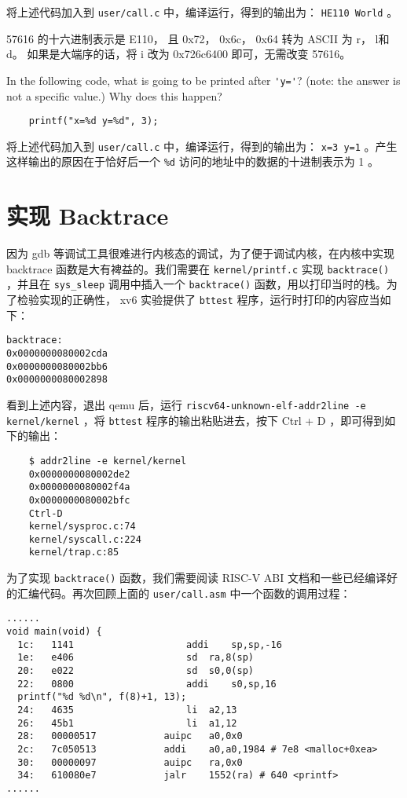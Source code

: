 \begin{solution}
将上述代码加入到 \lstinline{user/call.c} 中，编译运行，得到的输出为： \lstinline{HE110 World} 。

57616 的十六进制表示是 E110， 且 0x72， 0x6c， 0x64 转为 ASCII 为 r， l和 d。 如果是大端序的话，将 i 改为 0x726c6400 即可，无需改变 57616。
\end{solution}

\begin{exercise}
    In the following code, what is going to be printed after \lstinline{'y='}? (note: the answer is not a specific value.) Why does this happen?
\begin{lstlisting}
    printf("x=%d y=%d", 3);
\end{lstlisting}
\end{exercise}

\begin{solution}
将上述代码加入到 \lstinline{user/call.c} 中，编译运行，得到的输出为： \lstinline{x=3 y=1} 。产生这样输出的原因在于恰好后一个 \lstinline{%d} 访问的地址中的数据的十进制表示为 1 。
\end{solution}

\section{实现 Backtrace }

因为 gdb 等调试工具很难进行内核态的调试，为了便于调试内核，在内核中实现 backtrace 函数是大有裨益的。我们需要在 \lstinline{kernel/printf.c} 实现 \lstinline{backtrace()} ，并且在 \lstinline{sys_sleep} 调用中插入一个 \lstinline{backtrace()} 函数，用以打印当时的栈。为了检验实现的正确性， xv6 实验提供了 \lstinline{bttest} 程序，运行时打印的内容应当如下：
\begin{lstlisting}
backtrace:
0x0000000080002cda
0x0000000080002bb6
0x0000000080002898
\end{lstlisting}

看到上述内容，退出 qemu 后，运行 \lstinline{riscv64-unknown-elf-addr2line -e kernel/kernel} ，将 \lstinline{bttest} 程序的输出粘贴进去，按下 Ctrl + D ，即可得到如下的输出：
\begin{lstlisting}
    $ addr2line -e kernel/kernel
    0x0000000080002de2
    0x0000000080002f4a
    0x0000000080002bfc
    Ctrl-D
    kernel/sysproc.c:74
    kernel/syscall.c:224
    kernel/trap.c:85
\end{lstlisting}

为了实现 \lstinline{backtrace()} 函数，我们需要阅读 RISC-V ABI 文档和一些已经编译好的汇编代码。再次回顾上面的 \lstinline{user/call.asm} 中一个函数的调用过程：
\begin{lstlisting}
......
void main(void) {
  1c:	1141                	addi	sp,sp,-16
  1e:	e406                	sd	ra,8(sp)
  20:	e022                	sd	s0,0(sp)
  22:	0800                	addi	s0,sp,16
  printf("%d %d\n", f(8)+1, 13);
  24:	4635                	li	a2,13
  26:	45b1                	li	a1,12
  28:	00000517          	auipc	a0,0x0
  2c:	7c050513          	addi	a0,a0,1984 # 7e8 <malloc+0xea>
  30:	00000097          	auipc	ra,0x0
  34:	610080e7          	jalr	1552(ra) # 640 <printf>
......
\end{lstlisting}


